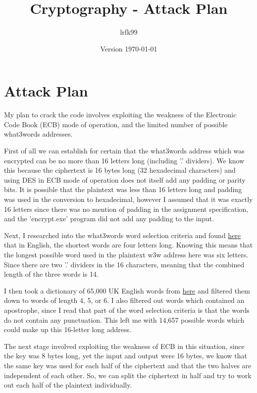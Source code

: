 \documentclass[a4paper, 11pt]{article}
\title{Cryptography - Attack Plan}
\date{Version \today}
\author{lrfk99}
\begin{document}
\maketitle

\section{Attack Plan}
 
My plan to crack the code involves exploiting the weakness of the Electronic Code Book (ECB) mode of operation, and the limited number of possible what3words addresses.

First of all we can establish for certain that the what3words address which was encrypted can be no more than 16 letters long (including '.' dividers). 
We know this because the ciphertext is 16 bytes long (32 hexadecimal characters) and using DES in ECB mode of operation does not itself add any padding or parity bits. 
It is possible that the plaintext was less than 16 letters long and padding was used in the conversion to hexadecimal, 
however I assumed that it was exactly 16 letters since there was no mention of padding in the assignment specification, 
and the 'encrypt.exe' program did not add any padding to the input.

Next, I researched into the what3words word selection criteria and found \href{https://support.what3words.com/en/articles/2212810-what-are-the-shortest-and-longest-words-used}{here}
that in English, the shortest words are four letters long. 
Knowing this means that the longest possible word used in the plaintext w3w address here was six letters. 
Since there are two '.' dividers in the 16 characters, meaning that the combined length of the three words is 14.

I then took a dictionary of 65,000 UK English words from \href{http://gwicks.net/dictionaries.htm}{here} and filtered them down to words of length 4, 5, or 6. 
I also filtered out words which contained an apostrophe, since I read that part of the word selection criteria is that the words do not contain any punctuation. 
This left me with 14,657 possible words which could make up this 16-letter long address. 

The next stage involved exploiting the weakness of ECB in this situation, since the key was 8 bytes long, yet the input and output were 16 bytes, 
we know that the same key was used for each half of the ciphertext and that the two halves are independent of each other. 
So, we can split the ciphertext in half and try to work out each half of the plaintext individually. 
\end{document}
